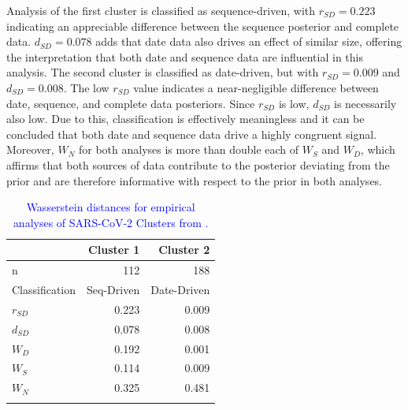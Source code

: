 \documentclass{article}
\begin{document}
Analysis of the first cluster is classified as sequence-driven, with $r_{SD} = 0.223$ indicating an appreciable difference between the sequence posterior and complete data. $d_{SD} = 0.078$ adds that date data also drives an effect of similar size, offering the interpretation that both date and sequence data are influential in this analysis. The second cluster is  classified as date-driven, but with $r_{SD} = 0.009$ and $d_{SD}=0.008$. The low $r_{SD}$ value indicates a near-negligible difference between date, sequence, and complete data posteriors. Since $r_{SD}$ is low, $d_{SD}$ is necessarily also low. Due to this, classification is effectively meaningless and it can be concluded that both date and sequence data drive a highly congruent signal. Moreover, $W_N$ for both analyses is more than double each of $W_S$ and $W_D$, which affirms that both sources of data contribute to the posterior deviating from the prior and are therefore informative with respect to the prior in both analyses.

\begin{table}[H]
\centering
\caption{\textcolor{blue}{Wasserstein distances for empirical analyses of SARS-CoV-2 Clusters from \cite{lane2021genomics}.}}
\begin{tabular}{lrr}
\midrule
                    &   Cluster 1      &   Cluster 2     \\
\midrule
n                   &   112             &   188             \\
Classification      &   Seq-Driven       &   Date-Driven    \\
$r_{SD}$          &   0.223            &   0.009          \\
$d_{SD}$          &   0.078           &   0.008          \\
$W_{D}$             &   0.192            &   0.001          \\
$W_{S}$             &   0.114            &   0.009          \\
$W_{N}$             &   0.325            &   0.481          \\
\bottomrule 
\label{tab:covidTab}
\end{tabular}
\end{table}
\end{document}
